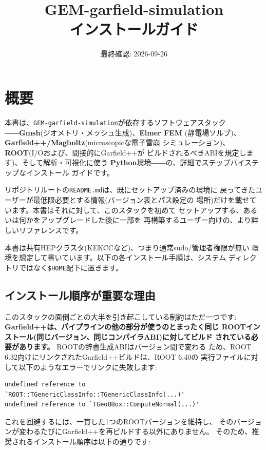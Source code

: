 \documentclass[11pt]{ltjsarticle}
\title{GEM-garfield-simulation \\ \large インストールガイド}
\author{}
\date{最終確認: 2026-09-26}
\begin{document}
\maketitle

\tableofcontents

\section{概要}

本書は、\texttt{GEM-garfield-simulation}が依存するソフトウェアスタック
――\textbf{Gmsh}(ジオメトリ・メッシュ生成)、\textbf{Elmer FEM}
(静電場ソルブ)、\textbf{Garfield++/Magboltz}(microscopicな電子雪崩
シミュレーション)、\textbf{ROOT}(I/Oおよび、間接的にGarfield++が
ビルドされるべきABIを規定します)、そして解析・可視化に使う
\textbf{Python}環境――の、詳細でステップバイステップなインストール
ガイドです。

リポジトリルートの\texttt{README.md}は、既にセットアップ済みの環境に
戻ってきたユーザーが最低限必要とする情報(バージョン表とパス設定の
場所)だけを載せています。本書はそれに対して、このスタックを初めて
セットアップする、あるいは何かをアップグレードした後に一部を
再構築するユーザー向けの、より詳しいリファレンスです。

本書は共有HEPクラスタ(KEKCCなど)、つまり通常sudo/管理者権限が無い
環境を想定して書いています。以下の各インストール手順は、システム
ディレクトリではなく\texttt{\$HOME}配下に置きます。

\subsection{インストール順序が重要な理由}

このスタックの面倒ごとの大半を引き起こしている制約はただ一つです:
\textbf{Garfield++は、パイプラインの他の部分が使うのとまったく同じ
ROOTインストール(同じバージョン、同じコンパイラABI)に対してビルド
されている必要があります。} ROOTの辞書生成ABIはバージョン間で変わる
ため、ROOT 6.32向けにリンクされたGarfield++ビルドは、ROOT 6.40の
実行ファイルに対して以下のようなエラーでリンクに失敗します:

\begin{lstlisting}
undefined reference to `ROOT::TGenericClassInfo::TGenericClassInfo(...)'
undefined reference to `TGeoBBox::ComputeNormal(...)'
\end{lstlisting}

これを回避するには、一貫した1つのROOTバージョンを維持し、
そのバージョンが変わるたびにGarfield++を再ビルドする以外にありません。
そのため、推奨されるインストール順序は以下の通りです:
\end{document}
